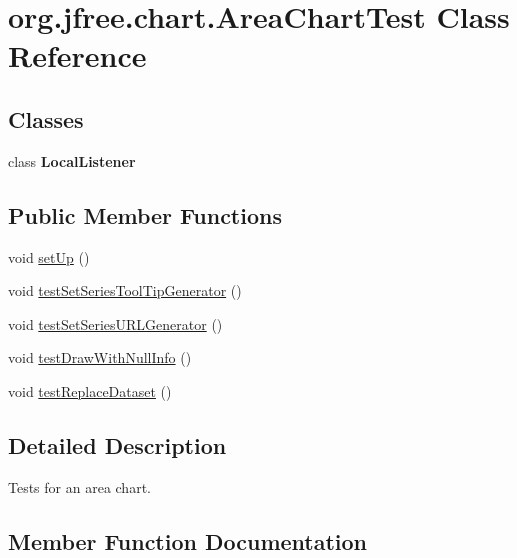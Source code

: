 \hypertarget{classorg_1_1jfree_1_1chart_1_1_area_chart_test}{}\section{org.\+jfree.\+chart.\+Area\+Chart\+Test Class Reference}
\label{classorg_1_1jfree_1_1chart_1_1_area_chart_test}
\subsection*{Classes}
\begin{DoxyCompactItemize}
\item 
class {\bfseries Local\+Listener}
\end{DoxyCompactItemize}
\subsection*{Public Member Functions}
\begin{DoxyCompactItemize}
\item 
void \mbox{\hyperlink{classorg_1_1jfree_1_1chart_1_1_area_chart_test_a4c547bd23952fa08d821169785dec612}{set\+Up}} ()
\item 
void \mbox{\hyperlink{classorg_1_1jfree_1_1chart_1_1_area_chart_test_a58fb38858cd61c715aa32f40256145d2}{test\+Set\+Series\+Tool\+Tip\+Generator}} ()
\item 
void \mbox{\hyperlink{classorg_1_1jfree_1_1chart_1_1_area_chart_test_aef356d63fb34478e9106991c7653117f}{test\+Set\+Series\+U\+R\+L\+Generator}} ()
\item 
void \mbox{\hyperlink{classorg_1_1jfree_1_1chart_1_1_area_chart_test_a23bebb4681d8b86f6e75d5963b403aca}{test\+Draw\+With\+Null\+Info}} ()
\item 
void \mbox{\hyperlink{classorg_1_1jfree_1_1chart_1_1_area_chart_test_ac20b767f626c28cbef5b13bc759348b9}{test\+Replace\+Dataset}} ()
\end{DoxyCompactItemize}


\subsection{Detailed Description}
Tests for an area chart. 

\subsection{Member Function Documentation}
\mbox{\label{classorg_1_1jfree_1_1chart_1_1_area_chart_test_a4c547bd23952fa08d821169785dec612}} 
